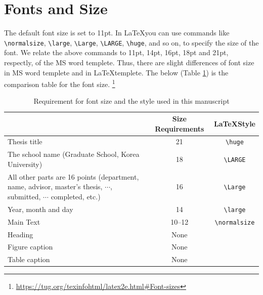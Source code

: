 \documentclass[11pt]{report}
\theoremstyle{plain}
\theoremstyle{definition}
\theoremstyle{corollary}
\theoremstyle{definition}
\theoremstyle{plain}
\theoremstyle{definition}
\theoremstyle{plain}
\begin{document}
\section{Fonts and Size}\label{sec:font}

The default font size is set to 11pt.
In \LaTeX you can use commands like \verb|\normalsize|, \verb|\large|, \verb|\Large|, \verb|\LARGE|, \verb|\huge|, and so on, to specify the size of the font.
We relate the above commands to 11pt, 14pt, 16pt, 18pt and 21pt, respectly, of the MS word templete.
Thus, there are slight differences of font size in MS word templete and in \LaTeX templete.
The below (Table \ref{tab:font size}) is the comparison table for the font size.
\footnote{\url{https://tug.org/texinfohtml/latex2e.html#Font-sizes}}
\begin{table}[h]\centering
\begin{tabular}{>{\centering\arraybackslash}p{6cm}cc}
\hline
&Size Requirements&\LaTeX Style\\\hline
Thesis title			&21&\verb|\huge|\\\hline
The school name (Graduate School, Korea University)
					&18&\verb|\LARGE|\\\hline
All other parts are 16 points (department, name, advisor, master's thesis, \(\cdots\), submitted, \(\cdots\) completed, etc.)	
					&16&\verb|\Large|\\\hline
Year, month and day	&14&\verb|\large|\\\hline
Main Text			&10--12&\verb|\normalsize|\\\hline
Heading				&None&\\\hline
Figure caption			&None&\\\hline
Table caption			&None&\\\hline
\end{tabular}
\caption{Requirement for font size and the style used in this manuscript}\label{tab:font size}
\end{table}

\end{document}
